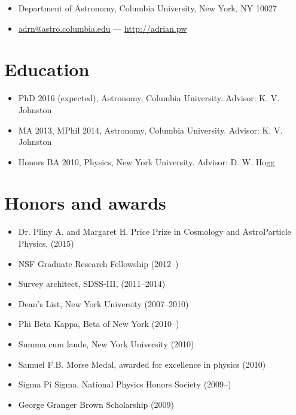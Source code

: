 \documentclass[12pt,letterpaper]{article}
\begin{document}
\thispagestyle{empty}\sloppy\sloppypar

{\huge \name}
\vspace{-0.5em}

\begin{itemize}
  \item Department of Astronomy, Columbia University, New York, NY 10027
  \item \href{mailto:adrn@astro.columbia.edu}{adrn@astro.columbia.edu} ---
		\href{http://adrian.pw}{http://adrian.pw}
\end{itemize}

\section*{Education}
	\begin{itemize}
	\item PhD 2016 (expected), Astronomy, Columbia University.
		{Advisor: K. V. Johnston}
	\item MA 2013, MPhil 2014, Astronomy, Columbia University.
		{Advisor: K. V. Johnston}
	\item Honors BA 2010, Physics, New York University.
		{Advisor: D. W. Hogg}
	\end{itemize}


\section*{Honors and awards}

	\begin{itemize}
        \item Dr. Pliny A. and Margaret H. Price Prize in Cosmology and AstroParticle Physics, (2015)
	\item NSF Graduate Research Fellowship (2012--)
	\item Survey architect, SDSS-III, (2011--2014)
	\item Dean's List, New York University (2007--2010)
	\item Phi Beta Kappa, Beta of New York (2010--)
	\item Summa cum laude, New York University (2010)
	\item Samuel F.B. Morse Medal, awarded for excellence in physics (2010)
	\item Sigma Pi Sigma, National Physics Honors Society (2009--)
	\item George Granger Brown Scholarship (2009)
	\end{itemize}
\end{document}
